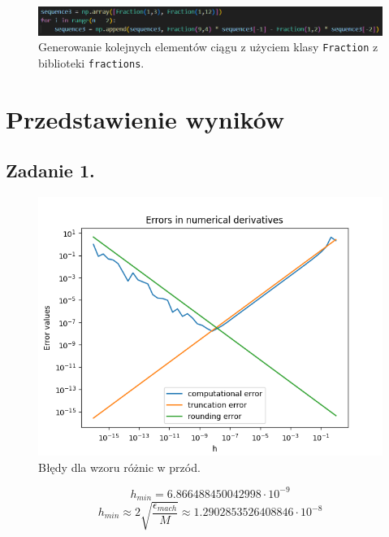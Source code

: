 \documentclass[11pt]{scrartcl}
\begin{document}
    \subsection*{}
    \begin{figure}[H]
        \includegraphics[width=1\linewidth]{fractions.png}
        \caption{Generowanie kolejnych elementów ciągu z użyciem klasy
        \texttt{Fraction} z biblioteki \texttt{fractions}.}
    \end{figure}

    \section{Przedstawienie wyników}
    \subsection{Zadanie 1.}
    \begin{figure}[H]
        \centering
        \includegraphics[width=0.8\linewidth]{Figure_1.png}
        \caption{Błędy dla wzoru różnic w przód.}
    \end{figure}
    \[
        h_{min}=6.866488450042998 \cdot 10^{-9}
    \]
    \[
        h_{min} \approx 2\sqrt{\frac{\epsilon_{mach}}{M}} \approx
        1.2902853526408846 \cdot 10^{-8}
    \]
\end{document}
